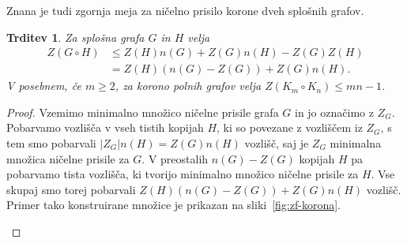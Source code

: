 \documentclass[12pt,a4paper,twoside]{article}
\theoremstyle{definition} %
\theoremstyle{plain} %
\newtheorem{trditev}[definicija]{Trditev}
\numberwithin{equation}{section}  %
\begin{document}

Znana je tudi zgornja meja za ničelno prisilo korone dveh splošnih grafov.
\begin{trditev}
    \label{trd:korona-zgornja-meja}
    Za splošna grafa $G$ in $H$ velja
    \begin{align*}
        Z(G \circ H) &\leq Z(H) n(G)+ Z(G) n(H) - Z(G) Z(H) \\
        &= Z(H) (n(G) - Z(G)) + Z(G) n(H).
    \end{align*} 
    V posebnem, če $m \geq 2$, za korono polnih grafov velja $Z(K_m \circ K_n) \leq mn - 1$. 
\end{trditev}
\begin{proof}
    Vzemimo minimalno množico ničelne prisile grafa $G$ in jo označimo z $Z_G$. Pobarvamo vozlišča v vseh tistih kopijah $H$, ki so povezane z vozliščem iz $Z_G$, s tem smo pobarvali $|Z_G| n(H) = Z(G) n(H)$ vozlišč, saj je $Z_G$ minimalna množica ničelne prisile za $G$. V preostalih $n(G) - Z(G)$ kopijah $H$ pa pobarvamo tista vozlišča, ki tvorijo minimalno množico ničelne prisile za $H$. Vse skupaj smo torej pobarvali $Z(H)(n(G) - Z(G)) + Z(G) n(H)$ vozlišč. Primer tako konstruirane množice je prikazan na sliki~\ref{fig:zf-korona}.
    \begin{figure}[h]
        \centering
\end{figure}
\end{proof}
\end{document}
